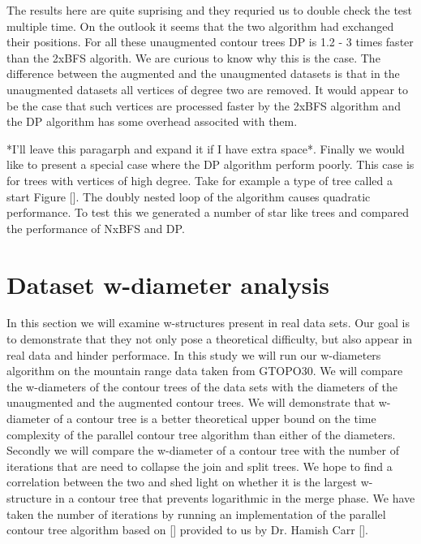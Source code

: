 The results here are quite suprising and they requried us to double check the test multiple time. On the outlook it seems that the two algorithm had exchanged their positions. For all these unaugmented contour trees DP is 1.2 - 3 times faster than the 2xBFS algorith. We are curious to know why this is the case. The difference between the augmented and the unaugmented datasets is that in the unaugmented datasets all vertices of degree two are removed. It would appear to be the case that such vertices are processed faster by the 2xBFS algorithm and the DP algorithm has some overhead associted with them.


*I'll leave this paragarph and expand it if I have extra space*. Finally we would like to present a special case where the DP algorithm perform poorly. This case is for trees with vertices of high degree. Take for example a type of tree called a start Figure []. The doubly nested loop of the algorithm causes quadratic performance. To test this we generated a number of star like trees and compared the performance of NxBFS and DP.

%
%


\section {Dataset w-diameter analysis}

In this section we will examine w-structures present in real data sets. Our goal is to demonstrate that they not only pose a theoretical difficulty, but also appear in real data and hinder performace. In this study we will run our w-diameters algorithm on the mountain range data taken from GTOPO30. We will compare the w-diameters of the contour trees of the data sets with the diameters of the unaugmented and the augmented contour trees. We will demonstrate that w-diameter of a contour tree is a better theoretical upper bound on the time complexity of the parallel contour tree algorithm than either of the diameters. Secondly we will compare the w-diameter of a contour tree with the number of iterations that are need to collapse the join and split trees. We hope to find a correlation between the two and shed light on whether it is the largest w-structure in a contour tree that prevents logarithmic in the merge phase. We have taken the number of iterations by running an implementation of the parallel contour tree algorithm based on [] provided to us by Dr. Hamish Carr [].

